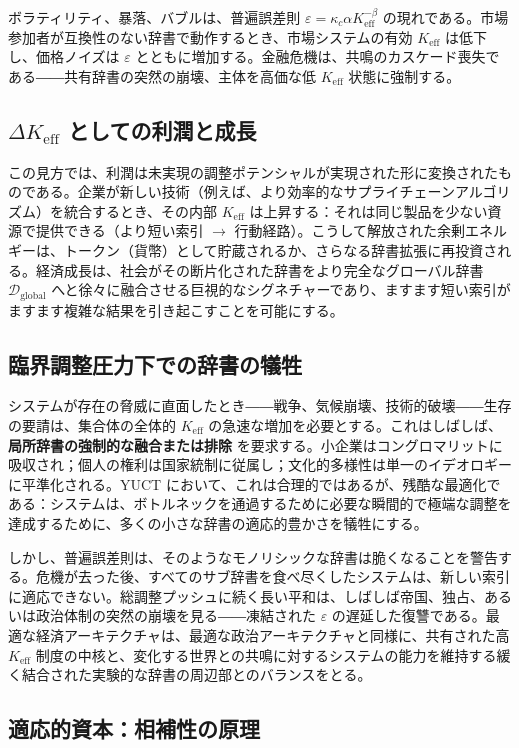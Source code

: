 \documentclass[12pt,a4paper]{article}
\newcommand{\Keff}{K_{\mathrm{eff}}}
\begin{document}
	ボラティリティ、暴落、バブルは、普遍誤差則 $\varepsilon = \kappa_c \alpha \Keff^{-\beta}$ の現れである。市場参加者が互換性のない辞書で動作するとき、市場システムの有効 $\Keff$ は低下し、価格ノイズは $\varepsilon$ とともに増加する。金融危機は、共鳴のカスケード喪失である――共有辞書の突然の崩壊、主体を高価な低 $\Keff$ 状態に強制する。
	
	\subsection{$\Delta\Keff$ としての利潤と成長}
	
	この見方では、利潤は未実現の調整ポテンシャルが実現された形に変換されたものである。企業が新しい技術（例えば、より効率的なサプライチェーンアルゴリズム）を統合するとき、その内部 $\Keff$ は上昇する：それは同じ製品を少ない資源で提供できる（より短い索引 $\rightarrow$ 行動経路）。こうして解放された余剰エネルギーは、トークン（貨幣）として貯蔵されるか、さらなる辞書拡張に再投資される。経済成長は、社会がその断片化された辞書をより完全なグローバル辞書 $\mathcal{D}_{\text{global}}$ へと徐々に融合させる巨視的なシグネチャーであり、ますます短い索引がますます複雑な結果を引き起こすことを可能にする。
	
	\subsection{臨界調整圧力下での辞書の犠牲}
	
	システムが存在の脅威に直面したとき――戦争、気候崩壊、技術的破壊――生存の要請は、集合体の全体的 $\Keff$ の急速な増加を必要とする。これはしばしば、\textbf{局所辞書の強制的な融合または排除} を要求する。小企業はコングロマリットに吸収され；個人の権利は国家統制に従属し；文化的多様性は単一のイデオロギーに平準化される。YUCT において、これは合理的ではあるが、残酷な最適化である：システムは、ボトルネックを通過するために必要な瞬間的で極端な調整を達成するために、多くの小さな辞書の適応的豊かさを犠牲にする。
	
	しかし、普遍誤差則は、そのようなモノリシックな辞書は脆くなることを警告する。危機が去った後、すべてのサブ辞書を食べ尽くしたシステムは、新しい索引に適応できない。総調整プッシュに続く長い平和は、しばしば帝国、独占、あるいは政治体制の突然の崩壊を見る――凍結された $\varepsilon$ の遅延した復讐である。最適な経済アーキテクチャは、最適な政治アーキテクチャと同様に、共有された高 $\Keff$ 制度の中核と、変化する世界との共鳴に対するシステムの能力を維持する緩く結合された実験的な辞書の周辺部とのバランスをとる。
	
	\subsection{適応的資本：相補性の原理}
	
\end{document}
